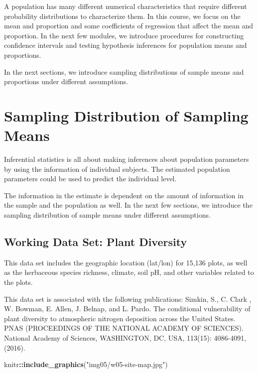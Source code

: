 \documentclass[
]{book}
\newenvironment{Shaded}{\begin{snugshade}}{\end{snugshade}}
\newcommand{\FunctionTok}[1]{\textcolor[rgb]{0.13,0.29,0.53}{\textbf{#1}}}
\newcommand{\NormalTok}[1]{#1}
\newcommand{\SpecialCharTok}[1]{\textcolor[rgb]{0.81,0.36,0.00}{\textbf{#1}}}
\newcommand{\StringTok}[1]{\textcolor[rgb]{0.31,0.60,0.02}{#1}}
\begin{document}
A population has many different numerical characteristics that require different probability distributions to characterize them. In this course, we focus on the mean and proportion and some coefficients of regression that affect the mean and proportion. In the next few modules, we introduce procedures for constructing confidence intervals and testing hypothesis inferences for population means and proportions.

In the next sections, we introduce sampling distributions of sample means and proportions under different assumptions.

\hypertarget{sampling-distribution-of-sampling-means}{%
\section{Sampling Distribution of Sampling Means}\label{sampling-distribution-of-sampling-means}}

Inferential statistics is all about making inferences about population parameters by using the information of individual subjects. The estimated population parameters could be used to predict the individual level.

The information in the estimate is dependent on the amount of information in the sample and the population as well. In the next few sections, we introduce the sampling distribution of sample means under different assumptions.

\hypertarget{working-data-set-plant-diversity}{%
\subsection{Working Data Set: Plant Diversity}\label{working-data-set-plant-diversity}}

This data set includes the geographic location (lat/lon) for 15,136 plots, as well as the herbaceous species richness, climate, soil pH, and other variables related to the plots.

This data set is associated with the following publications: Simkin, S., C. Clark , W. Bowman, E. Allen, J. Belnap, and L. Pardo. The conditional vulnerability of plant diversity to atmospheric nitrogen deposition across the United States. PNAS (PROCEEDINGS OF THE NATIONAL ACADEMY OF SCIENCES). National Academy of Sciences, WASHINGTON, DC, USA, 113(15): 4086-4091, (2016).

\begin{Shaded}
\begin{Highlighting}[]
\NormalTok{knitr}\SpecialCharTok{::}\FunctionTok{include\_graphics}\NormalTok{(}\StringTok{"img05/w05{-}site{-}map.jpg"}\NormalTok{)}
\end{Highlighting}
\end{Shaded}
\end{document}
